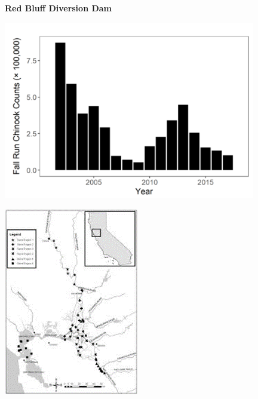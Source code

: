 \documentclass[]{article}\usepackage[]{graphicx}\usepackage[]{color}
\begin{document}
\vspace{1cm}

\begin{Row}
  \begin{Cell}{7}
    \begin{center}
      {\bf {\large Red Bluff Diversion Dam}}
    \end{center}
  \end{Cell}
  \begin{Cell}{6}
  \end{Cell}
\end{Row}

\begin{Row}
  \begin{Cell}{7}
    \begin{center}
      \includegraphics[width=11cm,trim=0 0 0 40,clip,align=m]{figures/salmon/red_bluff_tmp.png}
    \end{center}
  \end{Cell}
  \begin{Cell}{6}
    \vspace{-2cm}
    \begin{center}
      \includegraphics[align=m]{figures/salmon/map_tmp.png}
    \end{center}
  \end{Cell}
\end{Row}
\end{document}
